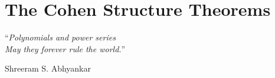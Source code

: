\section{The Cohen Structure Theorems}

\epigraph{``\emph{Polynomials and power series\\May they forever rule the world.}''}{Shreeram S. Abhyankar}




